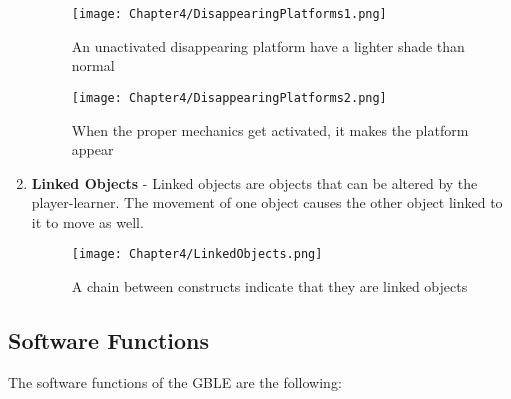 \begin{enumerate}
\begin{figure}[H]
\hspace*{-1cm}
   \centering                  
   \texttt{[image: Chapter4/DisappearingPlatforms1.png]}      
   \caption{An unactivated disappearing platform have a lighter shade than normal}
    \label{fig:dplatforms1}
\end{figure}
\begin{figure}[H]
\hspace*{-1cm}
   \centering                  
   \texttt{[image: Chapter4/DisappearingPlatforms2.png]}      
   \caption{When the proper mechanics get activated, it makes the platform appear}
    \label{fig:dplatforms2}
\end{figure}
    \item \textbf{Linked Objects} - Linked objects are objects that can be altered by the player-learner. The movement of one object causes the other object linked to it to move as well.
\begin{figure}[H]
\hspace*{-1cm}
   \centering                  
   \texttt{[image: Chapter4/LinkedObjects.png]}      
   \caption{A chain between constructs indicate that they are linked objects}
    \label{fig:linkedobjects}
\end{figure}
\end{enumerate}


\subsection{Software Functions}
The software functions of the GBLE are the following:

